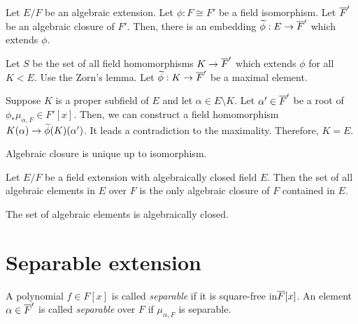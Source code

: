 \documentclass{../exp}
\begin{document}
\begin{thm}
Let $E/F$ be an algebraic extension.
Let $\phi:F\cong F'$ be a field isomorphism.
Let $\overline F'$ be an algebraic closure of $F'$.
Then, there is an embedding $\tld\phi:E\to\cl F'$ which extends $\phi$.
\end{thm}
\begin{pf}
Let $S$ be the set of all field homomorphisms $K\to\cl F'$ which extends $\phi$ for all $K<E$.
Use the Zorn's lemma.
Let $\tld\phi:K\to\cl F'$ be a maximal element.

Suppose $K$ is a proper subfield of $E$ and let $\alpha\in E\setminus K$.
Let $\alpha'\in\overline F'$ be a root of $\phi_*\mu_{\alpha,F}\in F'[x]$.
Then, we can construct a field homomorphism $K(\alpha)\to\tld\phi(K)(\alpha')$.
It leads a contradiction to the maximality.
Therefore, $K=E$.
\end{pf}


\begin{thm}
Algebraic closure is unique up to isomorphism.
\end{thm}
\begin{pf}
\end{pf}

\begin{prop}
Let $E/F$ be a field extension with algebraically closed field $E$.
Then the set of all algebraic elements in $E$ over $F$ is the only algebraic closure of $F$ contained in $E$.
\end{prop}
\begin{pf}
The set of algebraic elements is algebraically closed.
\end{pf}















\section{Separable extension}



\begin{defn}
A polynomial $f\in F[x]$ is called \emph{separable} if it is square-free in$\overline F[x]$.
An element $\alpha\in\overline F'$ is called \emph{separable} over $F$ if $\mu_{\alpha,F}$ is separable.
\end{defn}
\end{document}
